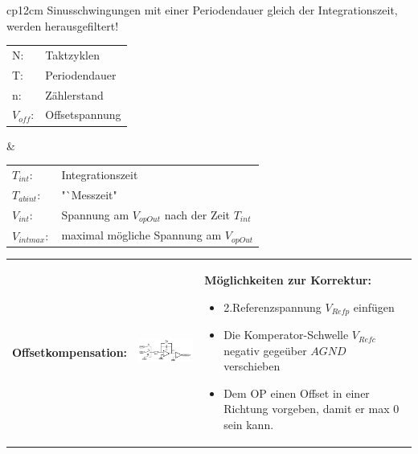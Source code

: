 \begin{longtable}{cp{12cm}}
 Sinusschwingungen mit einer Periodendauer gleich der Integrationszeit, werden herausgefiltert!\\ 
  \begin{tabular}{ll}
    N:&Taktzyklen\\
    T:&Periodendauer\\
    n:&Zählerstand\\
    $V_{off}$:&Offsetspannung\\
  \end{tabular} &
  
  \begin{tabular}{ll}
    $T_{int}$:&Integrationszeit\\
    $T_{abint}$:& "`Messzeit"\\
    $V_{int}$:&Spannung am $V_{opOut}$ nach der Zeit $T_{int}$\\
    $V_{intmax}:$&maximal mögliche Spannung am $V_{opOut}$\\
  \end{tabular}
\end{longtable}

\begin{longtable}{p{4cm}p{6cm}p{8cm}}
  \textbf{Offsetkompensation:} &
  \includegraphics[width=6cm, valign=t]{pictures/offsetkompensation} &
  \textbf{Möglichkeiten zur Korrektur:}
  \begin{itemize}
    \item 2.Referenzspannung $V_{Refp}$ einfügen
    \item Die Komperator-Schwelle $V_{Refc}$ negativ gegeüber $AGND$ verschieben
    \item Dem OP einen Offset in einer Richtung vorgeben, damit er max 0 sein kann.
  \end{itemize}
\end{longtable}

\newpage

